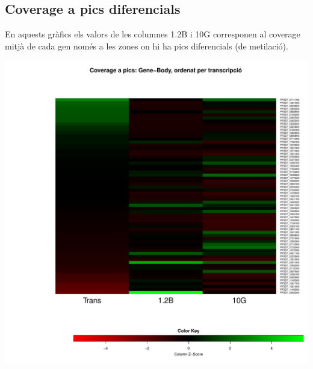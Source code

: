 \documentclass{article}\usepackage[]{graphicx}\usepackage[]{color}
\newenvironment{knitrout}{}{} %
\begin{document}
\subsection{Coverage a pics diferencials}
En aquests gràfics els valors de les columnes 1.2B i 10G corresponen al coverage mitjà de cada gen només a les zones on hi ha pics diferencials (de metilació).
\begin{knitrout}
\color{fgcolor}

{\centering \includegraphics[width=.9\linewidth]{figure/minimal-heat_difpeak_cov-1} 

}



\end{knitrout}
\clearpage
\end{document}
